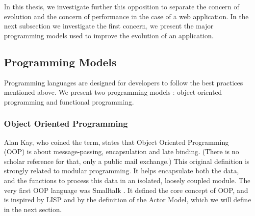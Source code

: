 In this thesis, we investigate further this opposition to separate the concern of evolution and the concern of performance in the case of a web application.
In the next subsection we investigate the first concern, we present the major programming models used to improve the evolution of an application.

\subsection{Programming Models}

Programming languages are designed for developers to follow the best practices mentioned above.
We present two programming models : object oriented programming and functional programming.

\subsubsection{Object Oriented Programming}


Alan Kay, who coined the term, states that Object Oriented Programming (OOP) is about message-passing, encapsulation and late binding.
(There is no scholar reference for that, only a public mail exchange.)
This original definition is strongly related to modular programming.
It helps encapsulate both the data, and the functions to process this data in an isolated, loosely coupled module.
The very first OOP language was Smalltalk \cite{Goldberg1984}.
It defined the core concept of OOP, and is inspired by LISP and by the definition of the Actor Model, which we will define in the next section.

